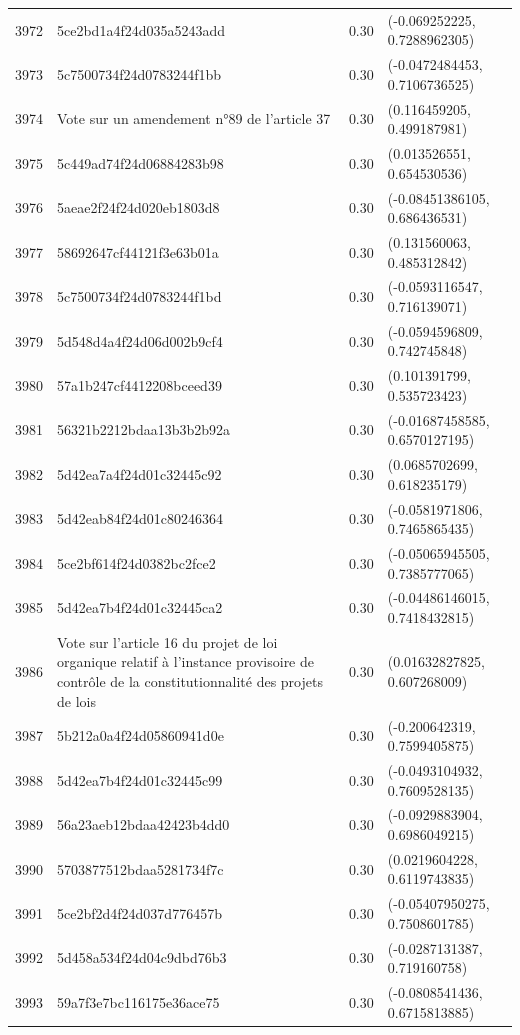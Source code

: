 \begin{table}[ht]
\begin{tabular}{rlrl}
  3972 & 5ce2bd1a4f24d035a5243add & 0.30 & (-0.069252225, 0.7288962305) \\ 
  3973 & 5c7500734f24d0783244f1bb & 0.30 & (-0.0472484453, 0.7106736525) \\ 
  3974 & Vote sur un amendement n°89 de l'article 37 & 0.30 & (0.116459205, 0.499187981) \\ 
  3975 & 5c449ad74f24d06884283b98 & 0.30 & (0.013526551, 0.654530536) \\ 
  3976 & 5aeae2f24f24d020eb1803d8 & 0.30 & (-0.08451386105, 0.686436531) \\ 
  3977 & 58692647cf44121f3e63b01a & 0.30 & (0.131560063, 0.485312842) \\ 
  3978 & 5c7500734f24d0783244f1bd & 0.30 & (-0.0593116547, 0.716139071) \\ 
  3979 & 5d548d4a4f24d06d002b9cf4 & 0.30 & (-0.0594596809, 0.742745848) \\ 
  3980 & 57a1b247cf4412208bceed39 & 0.30 & (0.101391799, 0.535723423) \\ 
  3981 & 56321b2212bdaa13b3b2b92a & 0.30 & (-0.01687458585, 0.6570127195) \\ 
  3982 & 5d42ea7a4f24d01c32445c92 & 0.30 & (0.0685702699, 0.618235179) \\ 
  3983 & 5d42eab84f24d01c80246364 & 0.30 & (-0.0581971806, 0.7465865435) \\ 
  3984 & 5ce2bf614f24d0382bc2fce2 & 0.30 & (-0.05065945505, 0.7385777065) \\ 
  3985 & 5d42ea7b4f24d01c32445ca2 & 0.30 & (-0.04486146015, 0.7418432815) \\ 
  3986 & Vote sur l'article 16 du projet de loi organique relatif à l'instance provisoire de contrôle de la constitutionnalité des projets de lois & 0.30 & (0.01632827825, 0.607268009) \\ 
  3987 & 5b212a0a4f24d05860941d0e & 0.30 & (-0.200642319, 0.7599405875) \\ 
  3988 & 5d42ea7b4f24d01c32445c99 & 0.30 & (-0.0493104932, 0.7609528135) \\ 
  3989 & 56a23aeb12bdaa42423b4dd0 & 0.30 & (-0.0929883904, 0.6986049215) \\ 
  3990 & 5703877512bdaa5281734f7c & 0.30 & (0.0219604228, 0.6119743835) \\ 
  3991 & 5ce2bf2d4f24d037d776457b & 0.30 & (-0.05407950275, 0.7508601785) \\ 
  3992 & 5d458a534f24d04c9dbd76b3 & 0.30 & (-0.0287131387, 0.719160758) \\ 
  3993 & 59a7f3e7bc116175e36ace75 & 0.30 & (-0.0808541436, 0.6715813885) \\ 

\end{tabular}
\end{table}
